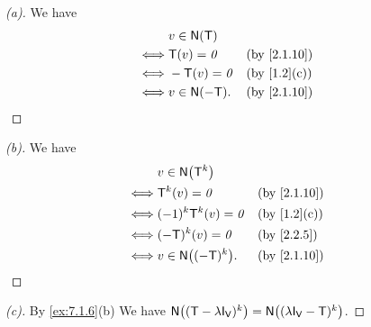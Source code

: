 \begin{proof}[(a)]
  We have
  \begin{align*}
         & v \in \ns{\T}                    \\
    \iff & \T(v) = \zv     &  & \by{2.1.10} \\
    \iff & -\T(v) = \zv    &  & \by{1.2}[c] \\
    \iff & v \in \ns{-\T}. &  & \by{2.1.10}
  \end{align*}
\end{proof}

\begin{proof}[(b)]
  We have
  \begin{align*}
         & v \in \ns{\T^k}                       \\
    \iff & \T^k(v) = \zv        &  & \by{2.1.10} \\
    \iff & (-1)^k \T^k(v) = \zv &  & \by{1.2}[c] \\
    \iff & (-\T)^k(v) = \zv     &  & \by{2.2.5}  \\
    \iff & v \in \ns{(-\T)^k}.  &  & \by{2.1.10}
  \end{align*}
\end{proof}

\begin{proof}[(c)]
  By \cref{ex:7.1.6}(b) We have \(\ns{(\T - \lambda \IT[\V])^k} = \ns{(\lambda \IT[\V] - \T)^k}\).
\end{proof}

